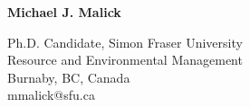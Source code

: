 \documentclass[11pt]{article}
\begin{document}
\thispagestyle{firststyle}


\begin{center}
{\Huge \textbf{Michael J. Malick}}
  \vspace*{0.25cm}

    Ph.D. Candidate, Simon Fraser University \\
    Resource and Environmental Management \\
    Burnaby, BC, Canada \\
    mmalick@sfu.ca \\
  
\end{center}
  \vspace*{0.25cm}






  
\end{document}
